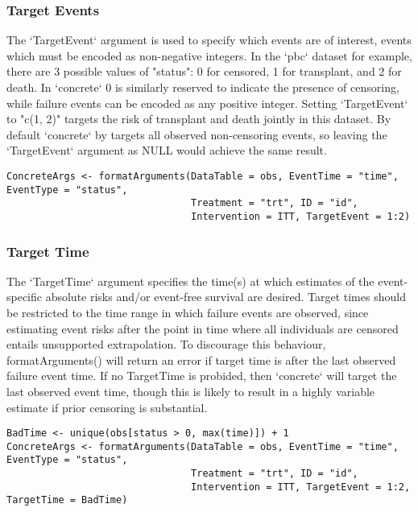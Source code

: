 \documentclass{report}
\newcommand{\1}{\ensuremath{\mathbf{1}}}
\begin{document}
\subsubsection{Target Events}
\label{sec:org2ed8b2c}
The `TargetEvent` argument is used to specify which events are of interest, events which must be encoded as non-negative integers. In the `pbc` dataset for example, there are 3 possible values of "status": 0 for censored, 1 for transplant, and 2 for death. In `concrete` 0 is similarly reserved to indicate the presence of censoring, while failure events can be encoded as any positive integer. Setting `TargetEvent` to "c(1, 2)" targets the risk of transplant and death jointly in this dataset. By default `concrete` by targets all observed non-censoring events, so leaving the `TargetEvent` argument as NULL would achieve the same result.

\begin{lstlisting}
ConcreteArgs <- formatArguments(DataTable = obs, EventTime = "time", EventType = "status", 
                                Treatment = "trt", ID = "id", 
                                Intervention = ITT, TargetEvent = 1:2)
\end{lstlisting}

\subsubsection{Target Time}
\label{sec:org54b4808}
The `TargetTime` argument specifies the time(s) at which estimates of the event-specific absolute risks and/or event-free survival are desired. Target times should be restricted to the time range in which failure events are observed, since estimating event risks after the point in time where all individuals are censored entails unsupported extrapolation. To discourage this behaviour, formatArguments() will return an error if target time is after the last observed failure event time. If no TargetTime is probided, then `concrete` will target the last observed event time, though this is likely to result in a highly variable estimate if prior censoring is substantial.

\begin{lstlisting}
BadTime <- unique(obs[status > 0, max(time)]) + 1
ConcreteArgs <- formatArguments(DataTable = obs, EventTime = "time", EventType = "status", 
                                Treatment = "trt", ID = "id", 
                                Intervention = ITT, TargetEvent = 1:2, TargetTime = BadTime)
\end{lstlisting}
\end{document}
